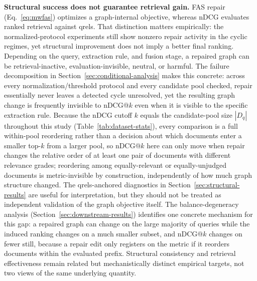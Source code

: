 \documentclass[manuscript,anonymous,review]{acmart}
\begin{document}
\textbf{Structural success does not guarantee retrieval gain.} FAS repair
(Eq.~\eqref{eq:mwfas}) optimizes a graph-internal objective, whereas nDCG
evaluates ranked retrieval against qrels. That distinction matters empirically:
the normalized-protocol experiments still show nonzero repair activity in the cyclic
regimes, yet structural improvement does not imply a better final ranking.
Depending on the query, extraction rule, and fusion stage, a repaired graph can
be retrieval-inactive, evaluation-invisible, neutral, or harmful. The
failure decomposition in Section~\ref{sec:conditional-analysis} makes this
concrete: across every normalization/threshold protocol and every candidate
pool checked, repair essentially never leaves a detected cycle unresolved,
yet the resulting graph change is frequently invisible to nDCG@$k$ even when
it is visible to the specific extraction rule. Because the nDCG cutoff $k$
equals the candidate-pool size $|D_q|$ throughout this study
(Table~\ref{tab:dataset-stats}), every comparison is a full within-pool
reordering rather than a decision about which documents enter a smaller
top-$k$ from a larger pool, so nDCG@$k$ here can only move when repair
changes the relative order of at least one pair of documents with different
relevance grades; reordering among equally-relevant or equally-unjudged
documents is metric-invisible by construction, independently of how much
graph structure changed. The qrels-anchored diagnostics in
Section~\ref{sec:structural-results} are useful for interpretation, but they
should not be treated as independent validation of the graph objective
itself. The balance-degeneracy analysis
(Section~\ref{sec:downstream-results}) identifies one concrete mechanism for
this gap: a repaired graph can change on the large majority of queries while
the induced ranking changes on a much smaller subset, and nDCG@$k$ changes on
fewer still, because a repair edit only registers on the metric if it
reorders documents within the evaluated prefix. Structural consistency and
retrieval effectiveness remain related but mechanistically distinct empirical
targets, not two views of the same underlying quantity.
\end{document}
